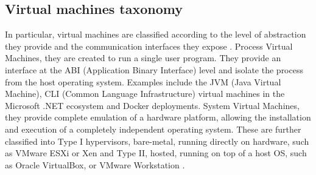 \subsection{Virtual machines taxonomy}
In particular, virtual machines are classified according to the level of abstraction they provide and the communication interfaces they expose \cite{vm-security.pdf}. Process Virtual Machines, they are created to run a single user program. They provide an interface at the ABI (Application Binary Interface) level and isolate the process from the host operating system. Examples include the JVM (Java Virtual Machine), CLI (Common Language Infrastructure) virtual machines in the Microsoft .NET ecosystem and Docker deployments. System Virtual Machines, they provide complete emulation of a hardware platform, allowing the installation and execution of a completely independent operating system. These are further classified into Type I hypervisors, bare-metal, running directly on hardware, such as VMware ESXi or Xen and Type II, hosted, running on top of a host OS, such as Oracle VirtualBox, or VMware Workstation \cite{king.pdf}.

